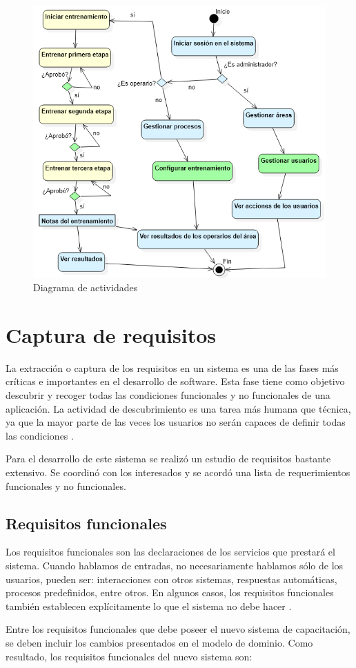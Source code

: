 \begin{figure}[h]
\centering
 \includegraphics[width=0.65\linewidth]{imagen/actividades.png}
 \caption{Diagrama de actividades}
 \label{fig:actividades} 
\end{figure} 

\section{Captura de requisitos}
La extracción o captura de los requisitos en un sistema es una de las fases más críticas e importantes en el desarrollo de software. Esta fase tiene como objetivo descubrir y recoger todas las condiciones funcionales y no funcionales de una aplicación. La actividad de descubrimiento es una tarea más humana que técnica, ya que la mayor parte de las veces los usuarios no serán capaces de definir todas las condiciones \cite{Dave2022}. 

Para el desarrollo de este sistema se realizó un estudio de requisitos bastante extensivo. Se coordinó con los interesados y se acordó una lista de requerimientos funcionales y no funcionales.

\subsection{Requisitos funcionales}
Los requisitos funcionales son las declaraciones de los servicios que prestará el sistema. Cuando hablamos de entradas, no necesariamente hablamos sólo de los usuarios, pueden ser: interacciones con otros sistemas, respuestas automáticas, procesos predefinidos, entre otros. En algunos casos, los requisitos funcionales también establecen explícitamente lo que el sistema no debe hacer \cite{Dave2022}.

Entre los requisitos funcionales que debe poseer el nuevo sistema de capacitación, se deben incluir los cambios presentados en el modelo de dominio. Como resultado, los requisitos funcionales del nuevo sistema son:

